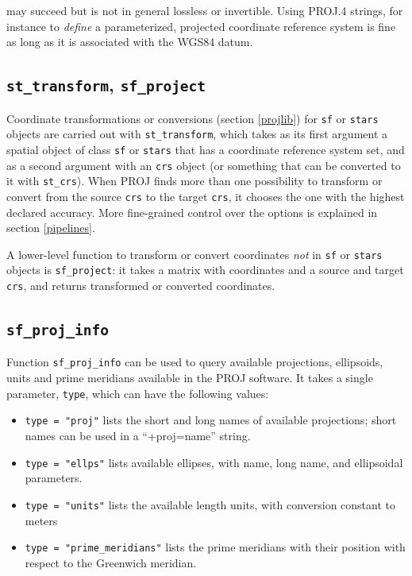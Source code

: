 \documentclass[]{book}
\providecommand{\tightlist}{%
  \setlength{\itemsep}{0pt}\setlength{\parskip}{0pt}}
\begin{document}
may succeed but is not in general lossless or invertible. Using
PROJ.4 strings, for instance to \emph{define} a parameterized, projected
coordinate reference system is fine as long as it is associated
with the WGS84 datum.

\hypertarget{st_transform-sf_project}{%
\subsection{\texorpdfstring{\texttt{st\_transform}, \texttt{sf\_project}}{st\_transform, sf\_project}}\label{st_transform-sf_project}}

Coordinate transformations or conversions (section \ref{projlib})
for \texttt{sf} or \texttt{stars} objects are carried out with \texttt{st\_transform},
which takes as its first argument a spatial object of class \texttt{sf} or
\texttt{stars} that has a coordinate reference system set, and as a second
argument with an \texttt{crs} object (or something that can be converted
to it with \texttt{st\_crs}). When PROJ finds more than one possibility
to transform or convert from the source \texttt{crs} to the target \texttt{crs},
it chooses the one with the highest declared accuracy. More fine-grained
control over the options is explained in section \ref{pipelines}.

A lower-level function to transform or convert coordinates \emph{not}
in \texttt{sf} or \texttt{stars} objects is \texttt{sf\_project}: it takes a matrix with
coordinates and a source and target \texttt{crs}, and returns transformed
or converted coordinates.

\hypertarget{sf_proj_info}{%
\subsection{\texorpdfstring{\texttt{sf\_proj\_info}}{sf\_proj\_info}}\label{sf_proj_info}}

Function \texttt{sf\_proj\_info} can be used to query available projections,
ellipsoids, units and prime meridians available in the PROJ
software. It takes a single parameter, \texttt{type}, which can have the
following values:

\begin{itemize}
\tightlist
\item
  \texttt{type\ =\ "proj"} lists the short and long names of available
  projections; short names can be used in a ``+proj=name'' string.
\item
  \texttt{type\ =\ "ellps"} lists available ellipses, with name, long name,
  and ellipsoidal parameters.
\item
  \texttt{type\ =\ "units"} lists the available length units, with conversion
  constant to meters
\item
  \texttt{type\ =\ "prime\_meridians"} lists the prime meridians with their
  position with respect to the Greenwich meridian.
\end{itemize}
\end{document}
